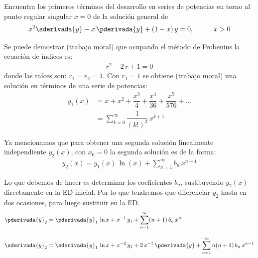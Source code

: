 \begin{ejemplo}

Encuentra los primeros términos del desarrollo en series de potencias en torno al punto regular singular $x = 0$ de la solución general de
\begin{align*}
x^{2} \sderivada{y}  - x \, \pderivada{y} + (1 - x) \, y = 0, \hspace{1cm} x > 0
\end{align*} 

Se puede demostrar (trabajo moral) que ocupando el método de Frobenius la ecuación de índices es:
\begin{align*}
r^{2} - 2 \, r + 1 = 0
\end{align*}
donde las raíces son: $r_{1} = r_{2} = 1$. Con $r_{1} = 1$ se obtiene (trabajo moral) una solución en términos de una serie de potencias:
\begin{align*}
y_{1}(x) &= x + x^{2} + \dfrac{x^{3}}{4} + \dfrac{x^{4}}{36} + \dfrac{x^{5}}{576} + \ldots \\[1em]
&= \sum_{k=0}^{\infty} \dfrac{1}{(k!)^{2}} \, x^{k+1}
\end{align*}

Ya mencionamos que para obtener una segunda solución linealmente independiente $y_{2}(x)$, con $x_{0}=0$ la segunda solución es de la forma:
\begin{align*}
y_{2} (x) = y_{1}(x) \, \ln (x) + \sum_{n=1}^{\infty} b_{n} \, x^{n+1}
\end{align*}

Lo que debemos de hacer es determinar los coeficientes $b_{n}$, sustituyendo $y_{2}(x)$ directamente en la ED inicial. Por lo que tendremos que diferenciar $y_{2}$ hasta en dos ocasiones, para luego sustituir en la ED.
\begin{align*}
\pderivada{y}_{2} &= \pderivada{y}_{1} \, \ln x + x^{-1} \, y_{1} + \sum_{n=1}^{\infty} (n + 1) \, b_{n} \, x^{n} \\[1em]
\sderivada{y}_{2} &= \sderivada{y}_{1} \, \ln x + x^{-2} \, y_{1} + 2 \, x^{-1} \, \pderivada{y} + \sum_{n=1}^{\infty} n (n + 1) \, b_{n} \, x^{n-1}
\end{align*}


\end{ejemplo}
